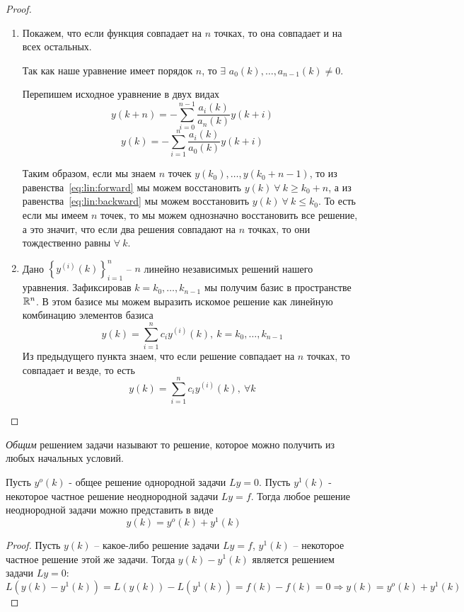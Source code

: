 \begin{proof}
  \begin{enumerate}
    \item Покажем, что если функция совпадает на $n$ точках,
          то она совпадает и на всех остальных.

          Так как наше уравнение имеет порядок $n$, то
          $\exists$ ${a_0(k)},\ldots,a_{n-1}(k)\neq0$.

          Перепишем исходное уравнение в двух видах
          \begin{equation}\label{eq:lin:forward}
            y(k+n)=-\sum_{i=0}^{n-1}\frac{a_i(k)}{a_n(k)}y(k+i)
          \end{equation}
          \begin{equation}\label{eq:lin:backward}
            y(k)=-\sum_{i=1}^{n}\frac{a_i(k)}{a_0(k)}y(k+i)
          \end{equation}

          Таким образом, если мы знаем $n$ точек $y(k_0),\ldots,y(k_0+n-1)$,
          то из равенства~\eqref{eq:lin:forward} мы можем восстановить $y(k)\ \forall\ k\geq k_0+n$,
          а из равенства~\eqref{eq:lin:backward} мы можем восстановить $y(k)\ \forall\ k\leq k_0$.
          То есть если мы имеем $n$ точек, то мы можем однозначно восстановить
          все решение, а это значит, что если два решения совпадают на
          $n$ точках, то они тождественно равны $\forall\ k$.
    \item Дано $\left\{y^{(i)}(k)\right\}_{i=1}^{n}$ -- $n$
          линейно независимых решений нашего уравнения. Зафиксировав
          $k=k_0,\ldots,k_{n-1}$ мы получим базис в пространстве $\mathbb{R}^n$.
          В этом базисе мы можем выразить искомое решение как линейную
          комбинацию элементов базиса
          \[y(k)=\sum_{i=1}^{n}c_iy^{(i)}(k),\ k=k_0,\ldots,k_{n-1}\]
          Из предыдущего пункта знаем, что если решение совпадает на $n$
          точках, то совпадает и везде, то есть
          \[y(k)=\sum_{i=1}^{n}c_iy^{(i)}(k),\ \forall k\]
  \end{enumerate}
\end{proof}

\begin{definition}
  \textit{Общим} решением задачи называют то решение, которое
  можно получить из любых начальных условий.
\end{definition}

\begin{theorem}
  Пусть $y^o(k)$ - общее решение однородной задачи $Ly=0$.
  Пусть $y^1(k)$ - некоторое частное решение неоднородной
  задачи $Ly=f$. Тогда любое решение неоднородной задачи
  можно представить в виде
  \[y(k)=y^o(k)+y^1(k)\]
\end{theorem}
\begin{proof}
  Пусть $y(k)$ -- какое-либо решение задачи $Ly=f$,
  $y^1(k)$ -- некоторое частное решение этой же задачи. Тогда
  $y(k)-y^1(k)$ является решением задачи $Ly=0$:
  \[L(y(k)-y^1(k))=L(y(k))-L(y^1(k))=f(k)-f(k)=0\Rightarrow y(k)=y^o(k)+y^1(k)\]
\end{proof}
